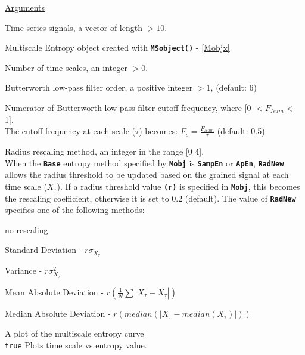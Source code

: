 \documentclass[12pt, a4paper, titlepage, openany]{book}
\begin{document}
\noindent \ul{Arguments}
\begin{description}[labelsep=1cm, labelwidth=2cm, nosep, style=multiline,leftmargin=3cm]\footnotesize
\item[\texttt{Sig}]		Time series signals, a vector of length $> 10$.
\item[\texttt{Mobj}]	Multiscale Entropy object created with \texttt{\textbf{MSobject()}} - \ref{Mobjx}
\item[\texttt{Scales}]		Number of time scales, an integer  $> 0$.
\item[\texttt{F\_Order}]	 Butterworth low-pass filter order, a positive integer $ > 1$, (default: 6) 
\item[\texttt{F\_Num}]	 Numerator of Butterworth low-pass filter cutoff frequency, where [0 $ <  F_{Num} < $ 1]. \\
The cutoff frequency at each scale ($\tau$) becomes: $F_{c} = \frac{F_{Num}}{\tau}$  (default: 0.5)
\item[\texttt{RadNew}]			Radius rescaling method, an integer in the range [0 4].\\
				 When the \texttt{\textbf{Base}} entropy method specified by \texttt{\textbf{Mobj}} is \texttt{\textbf{SampEn}} or \texttt{\textbf{ApEn}}, \texttt{\textbf{RadNew}} allows the radius threshold to be updated based on the grained signal at each time scale ($X_\tau$). If a radius threshold value \texttt{\textbf{(r)}} is specified in \texttt{\textbf{Mobj}},  this becomes the rescaling coefficient, otherwise it is set to 0.2 (default). The value of \texttt{\textbf{RadNew}} specifies one of the following methods:
	\begin{description}[labelsep=5em, labelwidth=4em, nosep,style=multiline,leftmargin=2cm]
		\item[0]	no rescaling
		\item[1]    Standard Deviation          - $r\sigma_{X_\tau}$
        \item[2]    Variance                    - $r\sigma_{X_\tau}^2$
        \item[3]    Mean Absolute Deviation     - $r(\frac{1}{N} \sum |X_{\tau} - \bar{X_{\tau}}|) $
        \item[4]    Median Absolute Deviation   - $r(median(|X_{\tau} - median(X_{\tau})|)) $
	\end{description} 
\item[\texttt{Plotx}]		A plot of the multiscale entropy curve\\
							\texttt{true} \hspace{15pt} Plots time scale vs entropy value.\\

\end{description}
\end{document}
